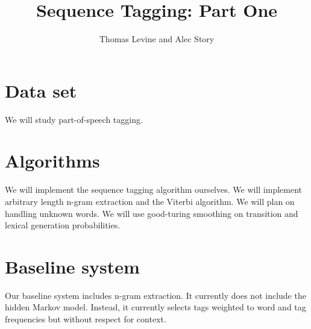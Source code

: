 \documentclass{article}
\title{Sequence Tagging: Part One}
\author{Thomas Levine and Alec Story}
\begin{document}
\section{Data set}
We will study part-of-speech tagging.
\section{Algorithms}
We will implement the sequence tagging algorithm ourselves.
We will implement arbitrary length n-gram extraction and the Viterbi algorithm.
We will plan on handling unknown words. %
We will use good-turing smoothing on transition and lexical generation probabilities. %


\section{Baseline system}
Our baseline system includes n-gram extraction.
It currently does not include the hidden Markov model.
Instead, it currently selects tags weighted
to word and tag frequencies but
without respect for context.

\end{document}
